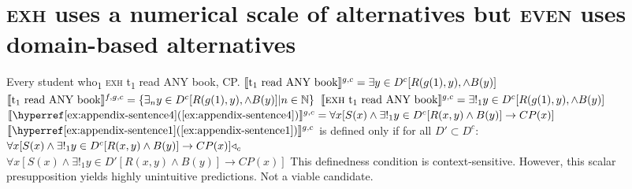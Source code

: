 \section{{\scshape exh} uses a numerical scale of alternatives but {\scshape even} uses domain-based alternatives}
\pex
\a Every student who\textsubscript{1} {\scshape exh} t\textsubscript{1} read \MakeUppercase{any} book, CP.
\a $\intension[g,c]{t\textsubscript{1} read ANY book}=\exists{y\in D^c}[R(g(1),y),\land B(y)]$
\a $\intension[f,g,c]{t\textsubscript{1} read ANY book}=\{\exists_n{y\in D^c}[R(g(1),y),\land B(y)]|n\in\mathbb{N}\}$
\a $\intension[g,c]{{\scshape exh} t\textsubscript{1} read ANY book}=\exists!_1{y\in D^c}[R(g(1),y),\land B(y)]$
\a $\intension[g,c]{\refex{appendix-sentence4}}=\forall{x}[S(x)\land\exists!_1{y\in D^c}[R(x,y)\land B(y)]\rightarrow CP(x)]$
\a $\intension[g,c]{\refex{appendix-sentence1}}$ is defined only if for all $D'\subset D^c$:\\$\forall{x}[S(x)\land\exists!_1{y\in D^c}[R(x,y)\land B(y)]\rightarrow CP(x)]\lprob_c$\\\emptyfill$\forall{x}[S(x)\land\exists!_1{y\in D'}[R(x,y)\land B(y)]\rightarrow CP(x)]$
\xe
This definedness condition is context-sensitive. However, this scalar presupposition yields highly unintuitive predictions. Not a viable candidate.